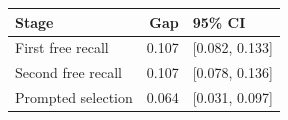 
\begin{tabular}{lrl}
\toprule
Stage & Gap & 95\% CI\\
\midrule
First free recall & 0.107 & {}[0.082, 0.133]\\
Second free recall & 0.107 & {}[0.078, 0.136]\\
Prompted selection & 0.064 & {}[0.031, 0.097]\\
\bottomrule
\end{tabular}
